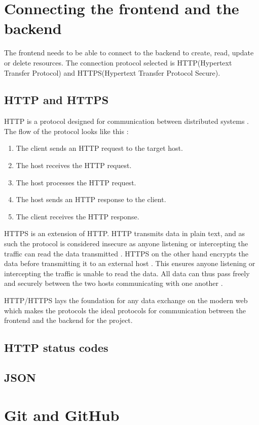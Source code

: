 \section{Connecting the frontend and the backend}
The frontend needs to be able to connect to the backend to create, read, update or delete resources.
The connection protocol selected is HTTP(Hypertext Transfer Protocol) and HTTPS(Hypertext Transfer Protocol Secure).

\subsection{HTTP and HTTPS}
HTTP is a protocol designed for communication between distributed systems \cite{mozilla_what_is_http}.
The flow of the protocol looks like this \cite{mozilla_http_flow}:
\begin{enumerate}
    \item The client sends an HTTP request to the target host.
    \item The host receives the HTTP request.
    \item The host processes the HTTP request.
    \item The host sends an HTTP response to the client.
    \item The client receives the HTTP response.
\end{enumerate}

HTTPS is an extension of HTTP.
HTTP transmits data in plain text, and as such the protocol is considered insecure as anyone listening or intercepting the traffic can read the data transmitted \cite{http_vs_https}.
HTTPS on the other hand encrypts the data before transmitting it to an external host \cite{https_explained}.
This ensures anyone listening or intercepting the traffic is unable to read the data.
All data can thus pass freely and securely between the two hosts communicating with one another \cite{http_vs_https}.

HTTP/HTTPS lays the foundation for any data exchange \cite{mozilla_http_overview} on the modern web \cite{tutsplus_what_is_http} which makes the protocols the ideal protocols for communication between the frontend and the backend for the project.

\subsection{HTTP status codes}

\subsection{JSON}

\section{Git and GitHub}